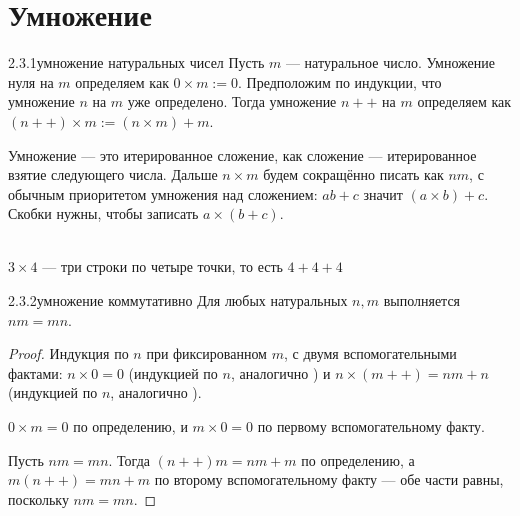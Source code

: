 \section{Умножение}

\begin{definition}{2.3.1}{умножение натуральных чисел}
Пусть $m$ — натуральное число. Умножение нуля на $m$ определяем как $0 \times m := 0$.
Предположим по индукции, что умножение $n$ на $m$ уже определено. Тогда умножение
$n{+}{+}$ на $m$ определяем как $(n{+}{+}) \times m := (n \times m) + m$.
\end{definition}

\begin{remark}
Умножение — это итерированное сложение, как сложение — итерированное взятие следующего
числа. Дальше $n \times m$ будем сокращённо писать как $nm$, с обычным приоритетом
умножения над сложением: $ab+c$ значит $(a \times b)+c$. Скобки нужны, чтобы записать
$a \times (b+c)$.

\begin{center}
\\
{\footnotesize\color{intuitiongray}$3\times4$ — три строки по четыре точки, то есть
$4+4+4$}
\end{center}
\end{remark}

\begin{lemma}{2.3.2}{умножение коммутативно}
Для любых натуральных $n,m$ выполняется $nm=mn$.
\end{lemma}

\begin{proof}
Индукция по $n$ при фиксированном $m$, с двумя вспомогательными фактами: $n \times 0=0$
(индукцией по $n$, аналогично ) и
$n \times (m{+}{+})=nm+n$ (индукцией по $n$, аналогично ).

 $0 \times m=0$ по определению, и $m \times 0=0$ по первому вспомогательному
факту.

 Пусть $nm=mn$. Тогда $(n{+}{+})m=nm+m$ по определению, а
$m(n{+}{+})=mn+m$ по второму вспомогательному факту — обе части равны, поскольку $nm=mn$.
\end{proof}

